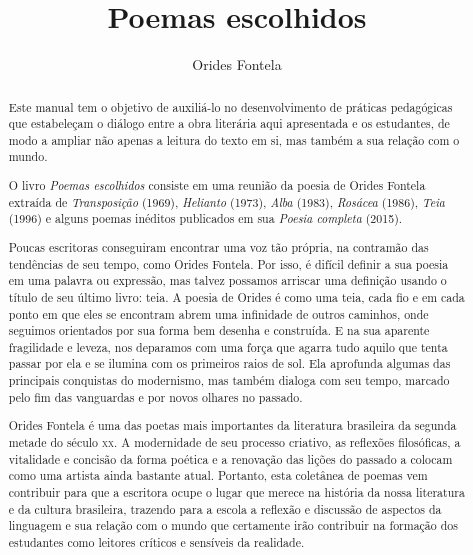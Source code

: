 \documentclass[12pt]{extarticle}
\begin{document}
\newcommand{\AutorLivro}{Orides Fontela}
\newcommand{\TituloLivro}{Poemas escolhidos}
\newcommand{\Tema}{Ficção, mistério e fantasia}
\newcommand{\Genero}{Poema}
\newcommand{\imagemCapa}{./images/PNLD0030-01.png}
\newcommand{\issnppub}{978-65-994484-0-9}
\newcommand{\issnepub}{978-65-994484-2-3}
\newcommand{\colaborador}{{Rodrigo Ribeiro Neves}}


\title{\TituloLivro}
\author{\AutorLivro}
\def\authornotes{\colaborador}

\date{}
\maketitle

\begin{abstract}
Este manual tem o objetivo de auxiliá-lo no desenvolvimento de práticas
pedagógicas que estabeleçam o diálogo entre a obra literária aqui
apresentada e os estudantes, de modo a ampliar não apenas a leitura do
texto em si, mas também a sua relação com o mundo.

O livro \emph{Poemas escolhidos} consiste em uma reunião da poesia de
Orides Fontela extraída de \emph{Transposição} (1969), \emph{Helianto}
(1973), \emph{Alba} (1983), \emph{Rosácea} (1986), \emph{Teia} (1996) e
alguns poemas inéditos publicados em sua \emph{Poesia completa} (2015).

Poucas escritoras conseguiram encontrar uma voz tão própria, na
contramão das tendências de seu tempo, como Orides Fontela. Por isso, é
difícil definir a sua poesia em uma palavra ou expressão, mas talvez
possamos arriscar uma definição usando o título de seu último livro:
teia. A poesia de Orides é como uma teia, cada fio e em cada ponto em
que eles se encontram abrem uma infinidade de outros caminhos, onde
seguimos orientados por sua forma bem desenha e construída. E na sua
aparente fragilidade e leveza, nos deparamos com uma força que agarra
tudo aquilo que tenta passar por ela e se ilumina com os primeiros raios
de sol. Ela aprofunda algumas das principais conquistas do modernismo,
mas também dialoga com seu tempo, marcado pelo fim das vanguardas e por
novos olhares no passado.

Orides Fontela é uma das poetas mais importantes da literatura
brasileira da segunda metade do século \textsc{xx}. A modernidade de seu processo
criativo, as reflexões filosóficas, a vitalidade e concisão da forma
poética e a renovação das lições do passado a colocam como uma artista
ainda bastante atual. Portanto, esta coletânea de poemas vem contribuir
para que a escritora ocupe o lugar que merece na história da nossa
literatura e da cultura brasileira, trazendo para a escola a reflexão e
discussão de aspectos da linguagem e sua relação com o mundo que
certamente irão contribuir na formação dos estudantes como leitores
críticos e sensíveis da realidade.



\end{abstract}
\end{document}
